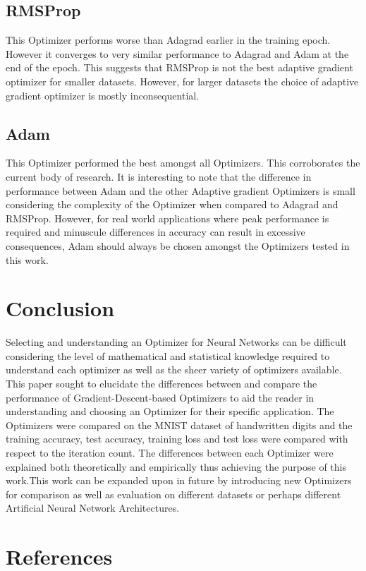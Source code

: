 \documentclass{article}
\begin{document}
\subsection{RMSProp}
This Optimizer performs worse than Adagrad earlier in the training epoch. However it converges to very similar performance to Adagrad and Adam at the end of the epoch. This suggests that RMSProp is not the best adaptive gradient optimizer for smaller datasets. However, for larger datasets the choice of adaptive gradient optimizer is mostly inconsequential. 

\subsection{Adam}

This Optimizer performed the best amongst all Optimizers. This corroborates the current body of research. It is interesting to note that the difference in performance between Adam and the other Adaptive gradient Optimizers is small considering the complexity of the Optimizer when compared to Adagrad and RMSProp. However, for real world applications where peak performance is required and minuscule differences in accuracy can result in excessive consequences, Adam should always be chosen amongst the Optimizers tested in this work. 
 


\section{Conclusion}
Selecting and understanding an Optimizer for Neural Networks can be difficult considering the level of mathematical and statistical knowledge required to understand each optimizer as well as the sheer variety of optimizers available. This paper sought to elucidate the differences between and compare the performance of Gradient-Descent-based Optimizers to aid the reader in understanding and choosing an Optimizer for their specific application. The Optimizers were compared on the MNIST dataset of handwritten digits and the training accuracy, test accuracy, training loss and test loss were compared with respect to the iteration count. The differences between each Optimizer were explained both theoretically and empirically thus achieving the purpose of this work.This work can be expanded upon in future by introducing new Optimizers for comparison as well as evaluation on different datasets or perhaps different Artificial Neural Network Architectures. 


\section{References}	
	


\end{document}
